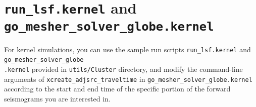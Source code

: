 \section{\texttt{run\_lsf.kernel} and \texttt{go\_mesher\_solver\_globe.kernel}}

For kernel simulations, you can use the sample run scripts \texttt{run\_lsf.kernel}
and \texttt{go\_mesher\_solver\_globe}~\\
\texttt{.kernel} provided in \texttt{utils/Cluster} directory, and modify
the command-line arguments of \texttt{xcreate\_adjsrc\_traveltime} in
\texttt{go\_mesher\_solver\_globe.kernel} according to the start and end time
of the specific portion of the forward seismograms you are interested
in.





